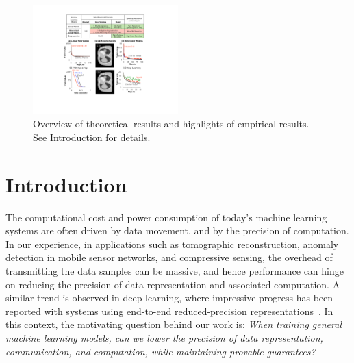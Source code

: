 \documentclass{article}
\begin{document}
\begin{figure}[t]
\centering
\includegraphics[width=0.5\textwidth]{Figures/RSHighlight}    
\vspace{-2em}
\caption{Overview of theoretical results and
highlights of empirical results. See
Introduction for details.}
\vspace{-1em}
\label{fig:highlight}
\end{figure}

\vspace{-2em}
\section{Introduction}

\vspace{-1em}
The computational cost and power consumption of today's machine learning systems are often driven by data movement, and by the precision of computation. 
In our experience, in applications such as tomographic reconstruction, anomaly detection in mobile sensor networks,
and compressive sensing, the overhead of transmitting the data samples can be massive, 
and hence performance can hinge on reducing the precision of data representation and 
associated computation. 
A similar trend is observed in deep learning, where impressive progress has been reported with systems 
using end-to-end reduced-precision representations~\cite{hubara2016quantized,
rastegari2016xnor,zhou2016dorefa,miyashita2016convolutional}. 
In this context, the motivating question behind our work is:  {\em When training general machine learning models,
can we lower the precision of data representation,
communication, and computation, while maintaining provable guarantees?}
 
% 
%
\end{document}
